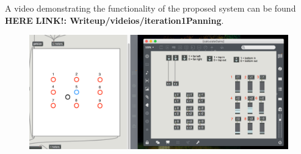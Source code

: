 \documentclass[../../main.tex]{subfiles}
\begin{document}
		 	A video demonstrating the functionality of the proposed system can be found \textbf{HERE} \textbf{LINK!: Writeup/videios/iteration1Panning}.

			\begin{figure}[H]
				\centerline{\includegraphics[scale = 0.45]{Sections/Implementation/Max/images/Max/iteration1/panning_edit2.png}}
				\caption{}
				\label{iteration1Panning}
			\end{figure}
\end{document}
